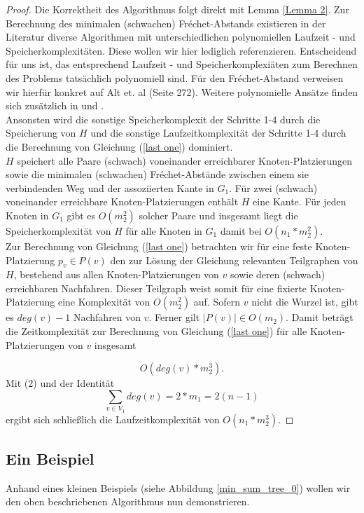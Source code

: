 \documentclass[a4paper, 12pt, twoside]{article}
\theoremstyle{Format1} %
\begin{document}
\begin{proof}
Die Korrektheit des Algorithmus folgt direkt mit Lemma \ref{Lemma 2}.
Zur Berechnung des minimalen (schwachen) Fréchet-Abstands existieren in der Literatur diverse Algorithmen mit unterschiedlichen polynomiellen Laufzeit - und Speicherkomplexitäten.
Diese wollen wir hier lediglich referenzieren. Entscheidend für uns ist, das entsprechend Laufzeit - und Speicherkomplexiäten zum Berechnen des Problems tatsächlich polynomiell sind.
Für den Fréchet-Abstand verweisen wir hierfür konkret auf Alt et. al \cite{Alt2} (Seite 272). Weitere polynomielle Ansätze finden sich zusätzlich in \cite{Ref1} und \cite{Ref2}.
\\
Ansonsten wird die sonstige Speicherkomplexit der Schritte 1-4 durch die Speicherung von $H$ und die sonstige Laufzeitkomplexität der Schritte 1-4 durch die Berechnung von
Gleichung (\ref{last one}) dominiert.
\\
$H$ speichert alle Paare (schwach) voneinander erreichbarer Knoten-Platzierungen sowie die minimalen (schwachen) Fréchet-Abstände zwischen einem sie verbindenden Weg
und der assoziierten Kante in $G_1$. Für zwei (schwach) voneinander erreichbare Knoten-Platzierungen enthält $H$ eine Kante. Für jeden Knoten in $G_1$ gibt es $O(m_2^2)$ solcher Paare
und insgesamt liegt die Speicherkomplexität von $H$ für alle Knoten in $G_1$ damit bei $O(n_1*m_2^2)$.
\\
Zur Berechnung von Gleichung (\ref{last one}) betrachten wir für eine feste Knoten-Platzierung $p_v \in P(v)$ den zur Lösung der Gleichung relevanten Teilgraphen von $H$,
bestehend aus allen Knoten-Platzierungen von $v$ sowie deren (schwach) erreichbaren Nachfahren. Dieser Teilgraph weist somit für eine fixierte Knoten-Platzierung eine Komplexität von $O(m_2^2)$ auf.
Sofern $v$ nicht die Wurzel ist, gibt es $deg(v)-1$ Nachfahren von $v$. Ferner gilt $|P(v)| \in O(m_2)$. Damit beträgt die Zeitkomplexität zur Berechnung von Gleichung (\ref{last one}) für alle
Knoten-Platzierungen von $v$ insgesamt

\begin{equation}
	O(deg(v)*m_2^3).
\end{equation}
Mit (2) und der Identität
\begin{equation}
	\sum_{v \in V_1} deg(v) = 2*m_1 = 2(n-1)
\end{equation}
ergibt sich schließlich die Laufzeitkomplexität von $O(n_1*m_2^3).$
\end{proof}
\newpage

\subsection{Ein Beispiel}
Anhand eines kleinen Beispiels (siehe Abbildung \ref{min_sum_tree_0}) wollen wir den oben beschriebenen Algorithmus nun demonstrieren.
\end{document}
